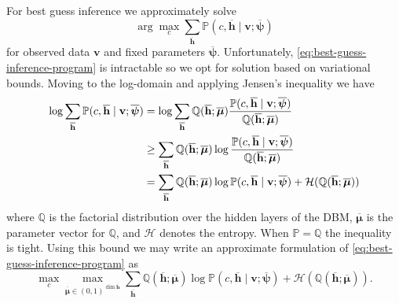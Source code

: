 \documentclass{article} %
\begin{document}
For best guess inference we approximately solve
\begin{equation}\label{eq:best-guess-inference-program}
\arg\max_c \sum_{\overline{\mathbf{h}}} \mathbb{P}(c,\overline{\mathbf{h}}\mid \mathbf{v} ;\overline{\boldsymbol{\psi}})
\end{equation}
for observed data $\mathbf{v}$ and fixed parameters
$\overline{\boldsymbol{\psi}}$.  Unfortunately, \autoref{eq:best-guess-inference-program}
is intractable \cite{chandrasekaran2012complexity} so we opt for solution based on variational bounds.
Moving to the log-domain and applying Jensen's inequality we have
\begin{align}
\log \sum_{\overline{\mathbf{h}}} \mathbb{P}(c,\overline{\mathbf{h}}\mid \mathbf{v};\overline{\boldsymbol{\psi}}) 
&= \log \sum_{\overline{\mathbf{h}}} \mathbb{Q}(\overline{\mathbf{h}};\overline{\boldsymbol{\mu}})
\frac{\mathbb{P}(c,\overline{\mathbf{h}}\mid \mathbf{v};\overline{\boldsymbol{\psi}})}{\mathbb{Q}(\overline{\mathbf{h}};\overline{\boldsymbol{\mu}})} \notag\\
&\geq \sum_{\overline{\mathbf{h}}} \mathbb{Q}(\overline{\mathbf{h}};\overline{\boldsymbol{\mu}})
\log \frac{\mathbb{P}(c,\overline{\mathbf{h}}\mid \mathbf{v};\overline{\boldsymbol{\psi}})}{\mathbb{Q}(\overline{\mathbf{h}};\overline{\boldsymbol{\mu}})}\notag\\
&= \sum_{\overline{\mathbf{h}}} \mathbb{Q}(\overline{\mathbf{h}};\overline{\boldsymbol{\mu}})
\log \mathbb{P}(c,\overline{\mathbf{h}}\mid \mathbf{v};\overline{\boldsymbol{\psi}}) + \mathcal{H}(\mathbb{Q}(\overline{\mathbf{h}};\overline{\boldsymbol{\mu}}))
\end{align}
where $\mathbb{Q}$ is the factorial distribution over the hidden layers of the DBM, $\overline{\boldsymbol{\mu}}$ is the parameter vector
for $\mathbb{Q}$, and $\mathcal{H}$ denotes the entropy.  When $\mathbb{P}=\mathbb{Q}$ the inequality is tight.  Using this bound we may
write an approximate formulation of \autoref{eq:best-guess-inference-program} as
\begin{equation}\label{eq:best-guess-mean-field-1}
\max_c \max_{\overline{\boldsymbol{\mu}}\in (0,1)^{\dim \overline{\mathbf{h}}}} \sum_{\overline{\mathbf{h}}} \mathbb{Q}(\overline{\mathbf{h}};\overline{\boldsymbol{\mu}})
\log \mathbb{P}(c,\overline{\mathbf{h}}\mid \mathbf{v};\overline{\boldsymbol{\psi}}) + \mathcal{H}(\mathbb{Q}(\overline{\mathbf{h}};\overline{\boldsymbol{\mu}})).
\end{equation}
\end{document}
